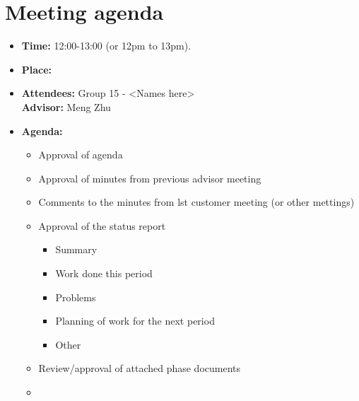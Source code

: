 \documentclass[12pt, a4paper]{article}
\begin{document}
\section{Meeting agenda }
\begin{itemize}
\item \textbf{Time:} 12:00-13:00 (or 12pm to 13pm).
\item \textbf{Place:} \\
\item \textbf{Attendees:} Group 15 - <Names here> \\ \textbf{Advisor:} Meng Zhu
\item \textbf{Agenda:} 
	\begin{itemize}
	\item Approval of agenda
	\item Approval of minutes from previous advisor meeting
	\item Comments to the minutes from lst customer meeting (or other mettings)
	\item Approval of the status report
		\begin{itemize}
		\item Summary
		\item Work done this period
		\item Problems
		\item Planning of work for the next period
		\item Other
	\end{itemize}
	\item Review/approval of attached phase documents
	\item <add other agenda items here>
	\end{itemize}
\end{itemize}
\end{document}
